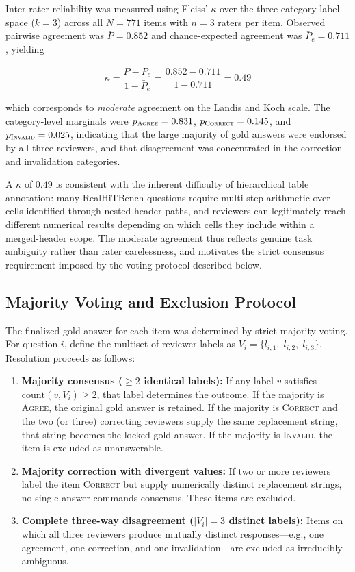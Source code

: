 ﻿\documentclass[a4paper]{article}
\begin{document}
Inter-rater reliability was measured using Fleiss' $\kappa$ over the three-category label space ($k = 3$) across all $N = 771$ items with $n = 3$ raters per item. Observed pairwise agreement was $\bar{P} = 0.852$ and chance-expected agreement was $\bar{P}_e = 0.711$, yielding

\[
\kappa = \frac{\bar{P} - \bar{P}_e}{1 - \bar{P}_e} = \frac{0.852 - 0.711}{1 - 0.711} = 0.49
\]

\noindent which corresponds to \emph{moderate} agreement on the Landis and Koch scale. The category-level marginals were $p_{\textsc{Agree}} = 0.831$, $p_{\textsc{Correct}} = 0.145$, and $p_{\textsc{Invalid}} = 0.025$, indicating that the large majority of gold answers were endorsed by all three reviewers, and that disagreement was concentrated in the correction and invalidation categories.

A $\kappa$ of $0.49$ is consistent with the inherent difficulty of hierarchical table annotation: many RealHiTBench questions require multi-step arithmetic over cells identified through nested header paths, and reviewers can legitimately reach different numerical results depending on which cells they include within a merged-header scope. The moderate agreement thus reflects genuine task ambiguity rather than rater carelessness, and motivates the strict consensus requirement imposed by the voting protocol described below.

\subsection{Majority Voting and Exclusion Protocol}

The finalized gold answer for each item was determined by strict majority voting. For question $i$, define the multiset of reviewer labels as $V_i = \{l_{i,1},\; l_{i,2},\; l_{i,3}\}$. Resolution proceeds as follows:

\begin{enumerate}
    \item \textbf{Majority consensus ($\ge 2$ identical labels):} If any label $v$ satisfies $\mathrm{count}(v, V_i) \ge 2$, that label determines the outcome. If the majority is \textsc{Agree}, the original gold answer is retained. If the majority is \textsc{Correct} and the two (or three) correcting reviewers supply the same replacement string, that string becomes the locked gold answer. If the majority is \textsc{Invalid}, the item is excluded as unanswerable.
    \item \textbf{Majority correction with divergent values:} If two or more reviewers label the item \textsc{Correct} but supply numerically distinct replacement strings, no single answer commands consensus. These items are excluded.
    \item \textbf{Complete three-way disagreement ($|V_i| = 3$ distinct labels):} Items on which all three reviewers produce mutually distinct responses---e.g., one agreement, one correction, and one invalidation---are excluded as irreducibly ambiguous.
\end{enumerate}
\end{document}
